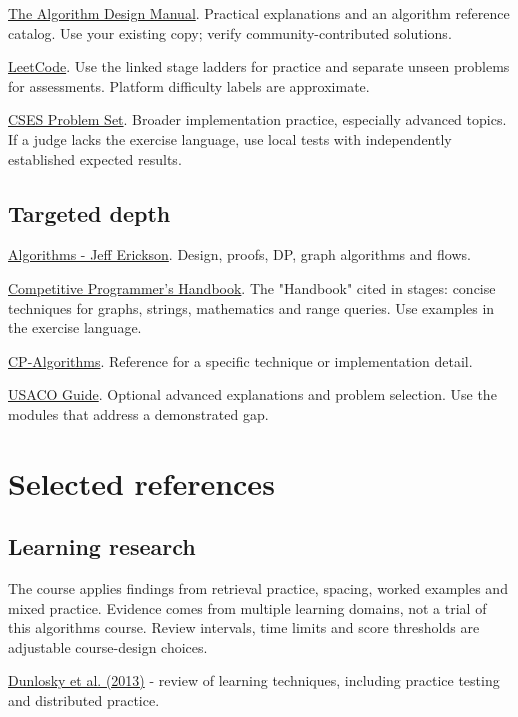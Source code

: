 \documentclass[11pt,letterpaper]{article}
\begin{document}
\href{https://algorist.com/}{The Algorithm Design Manual}. Practical explanations and an algorithm reference catalog. Use your existing copy; verify community-contributed solutions.

\href{https://leetcode.com/problemset/}{LeetCode}. Use the linked stage ladders for practice and separate unseen problems for assessments. Platform difficulty labels are approximate.

\href{https://cses.fi/problemset/}{CSES Problem Set}. Broader implementation practice, especially advanced topics. If a judge lacks the exercise language, use local tests with independently established expected results.

\subsection*{Targeted depth}

\href{https://jeffe.cs.illinois.edu/teaching/algorithms/index.html}{Algorithms - Jeff Erickson}. Design, proofs, DP, graph algorithms and flows.

\href{https://cses.fi/book/book.pdf}{Competitive Programmer's Handbook}. The "Handbook" cited in stages: concise techniques for graphs, strings, mathematics and range queries. Use examples in the exercise language.

\href{https://cp-algorithms.com/}{CP-Algorithms}. Reference for a specific technique or implementation detail.

\href{https://usaco.guide/}{USACO Guide}. Optional advanced explanations and problem selection. Use the modules that address a demonstrated gap.

\section{Selected references}\label{sec:27}

\subsection*{Learning research}

The course applies findings from retrieval practice, spacing, worked examples and mixed practice. Evidence comes from multiple learning domains, not a trial of this algorithms course. Review intervals, time limits and score thresholds are adjustable course-design choices.

\href{https://acs.ist.psu.edu/ist521/dunloskyRMNW13.pdf}{Dunlosky et al. (2013)} - review of learning techniques, including practice testing and distributed practice.
\end{document}
